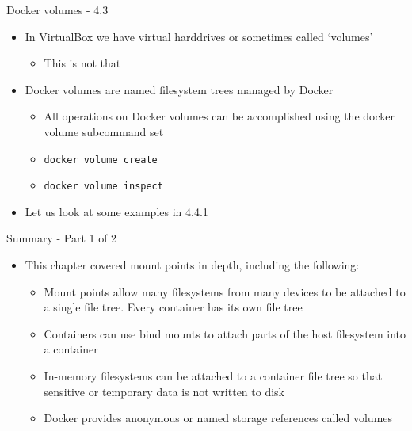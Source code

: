 \documentclass[ignorenonframetext,]{beamer}
\providecommand{\tightlist}{%
  \setlength{\itemsep}{0pt}\setlength{\parskip}{0pt}}
\begin{document}
\begin{frame}[fragile]{Docker volumes - 4.3}
\protect\hypertarget{docker-volumes---4.3}{}

\begin{itemize}
\tightlist
\item
  In VirtualBox we have virtual harddrives or sometimes called `volumes'

  \begin{itemize}
  \tightlist
  \item
    This is not that
  \end{itemize}
\item
  Docker volumes are named filesystem trees managed by Docker

  \begin{itemize}
  \tightlist
  \item
    All operations on Docker volumes can be accomplished using the
    docker volume subcommand set
  \item
    \texttt{docker\ volume\ create}
  \item
    \texttt{docker\ volume\ inspect}
  \end{itemize}
\item
  Let us look at some examples in 4.4.1
\end{itemize}

\end{frame}

\begin{frame}{Summary - Part 1 of 2}
\protect\hypertarget{summary---part-1-of-2}{}

\begin{itemize}
\tightlist
\item
  This chapter covered mount points in depth, including the following:

  \begin{itemize}
  \tightlist
  \item
    Mount points allow many filesystems from many devices to be attached
    to a single file tree. Every container has its own file tree
  \item
    Containers can use bind mounts to attach parts of the host
    filesystem into a container
  \item
    In-memory filesystems can be attached to a container file tree so
    that sensitive or temporary data is not written to disk
  \item
    Docker provides anonymous or named storage references called volumes
  \end{itemize}
\end{itemize}

\end{frame}
\end{document}
